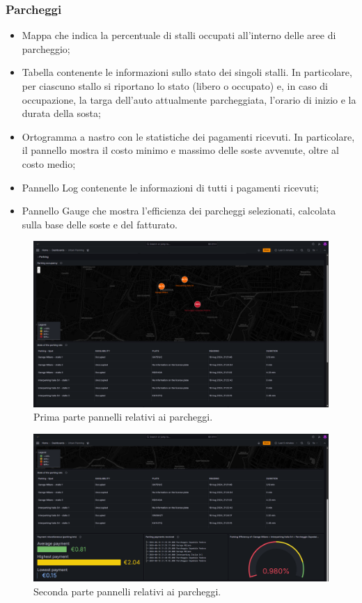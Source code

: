 \documentclass[8pt]{article}
\begin{document}
\subsubsection{Parcheggi}
\begin{itemize}
\setlength\itemsep{0em}
    \item Mappa che indica la percentuale di stalli occupati all'interno delle aree di parcheggio;
    \item Tabella contenente le informazioni sullo stato dei singoli stalli. In particolare, per ciascuno stallo si riportano lo stato (libero o occupato) e, in caso di occupazione, la targa dell'auto attualmente parcheggiata, l'orario di inizio e la durata della sosta;
    \item Ortogramma a nastro con le statistiche dei pagamenti ricevuti. In particolare, il pannello mostra il costo minimo e massimo delle soste avvenute, oltre al costo medio;
    \item Pannello Log contenente le informazioni di tutti i pagamenti ricevuti;
    \item Pannello Gauge che mostra l'efficienza dei parcheggi selezionati, calcolata sulla base delle soste e del fatturato.
\end{itemize}
\begin{figure}[H]
    \centering
    \includegraphics[width=15cm]{images_mu/parking1.png}
    \caption{Prima parte pannelli relativi ai parcheggi.}
    \label{fig:Prima parte pannelli relativi ai parcheggi.}
\end{figure}
\begin{figure}[H]
    \centering
    \includegraphics[width=15cm]{images_mu/parking2.png}
    \caption{Seconda parte pannelli relativi ai parcheggi.}
    \label{fig:Seconda parte pannelli relativi ai parcheggi.}
\end{figure}
\end{document}
